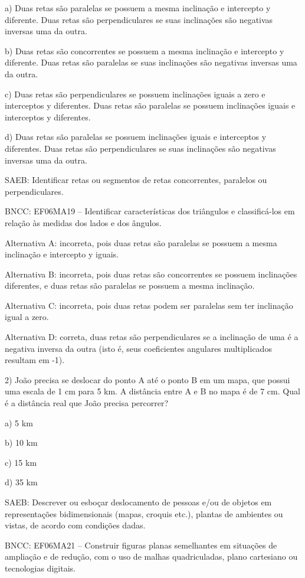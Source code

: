 a) Duas retas são paralelas se possuem a mesma inclinação e intercepto y
diferente. Duas retas são perpendiculares se suas inclinações são
negativas inversas uma da outra.

b) Duas retas são concorrentes se possuem a mesma inclinação e
intercepto y diferente. Duas retas são paralelas se suas inclinações são
negativas inversas uma da outra.

c) Duas retas são perpendiculares se possuem inclinações iguais a zero e
interceptos y diferentes. Duas retas são paralelas se possuem
inclinações iguais e interceptos y diferentes.

d) Duas retas são paralelas se possuem inclinações iguais e interceptos
y diferentes. Duas retas são perpendiculares se suas inclinações são
negativas inversas uma da outra.

SAEB: Identificar retas ou segmentos de retas concorrentes, paralelos ou
perpendiculares.

BNCC: EF06MA19 -- Identificar características dos triângulos e
classificá-los em relação às medidas dos lados e dos ângulos.

Alternativa A: incorreta, pois duas retas são paralelas se possuem a
mesma inclinação e intercepto y iguais.

Alternativa B: incorreta, pois duas retas são concorrentes se possuem
inclinações diferentes, e duas retas são paralelas se possuem a mesma
inclinação.

Alternativa C: incorreta, pois duas retas podem ser paralelas sem ter
inclinação igual a zero.

Alternativa D: correta, duas retas são perpendiculares se a inclinação
de uma é a negativa inversa da outra (isto é, seus coeficientes
angulares multiplicados resultam em -1).

2) João precisa se deslocar do ponto A até o ponto B em um mapa, que
possui uma escala de 1 cm para 5 km. A distância entre A e B no mapa é
de 7 cm. Qual é a distância real que João precisa percorrer?

a) 5 km

b) 10 km

c) 15 km

d) 35 km

SAEB: Descrever ou esboçar deslocamento de pessoas e/ou de objetos em
representações bidimensionais (mapas, croquis etc.), plantas de
ambientes ou vistas, de acordo com condições dadas.

BNCC: EF06MA21 -- Construir figuras planas semelhantes em situações de
ampliação e de redução, com o uso de malhas quadriculadas, plano
cartesiano ou tecnologias digitais.


